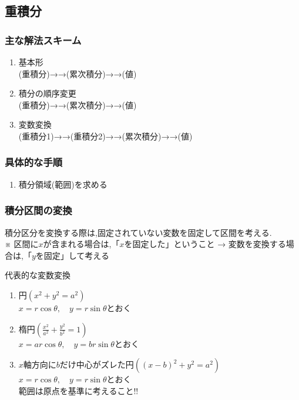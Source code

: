 \documentclass[a4paper]{jsarticle}
\begin{document}
\subsection{重積分}
\subsubsection{主な解法スキーム}
\begin{enumerate}[(1)]
    \item 基本形\\
          (重積分)→→(累次積分)→→(値)
    \item 積分の順序変更\\
          (重積分)→→(累次積分)→→(値)
    \item 変数変換\\
          (重積分1)→→(重積分2)→→(累次積分)→→(値)
\end{enumerate}
\subsubsection{具体的な手順}
\begin{enumerate}[(1)]
    \item 積分領域(範囲)を求める
\end{enumerate}
\subsubsection{積分区間の変換}
積分区分を変換する際は,固定されていない変数を固定して区間を考える.\\
※ 区間に$x$が含まれる場合は,「$x$を固定した」ということ → 変数を変換する場合は,「$y$を固定」して考える
\begin{itembox}[l]{代表的な変数変換}
    \begin{enumerate}[(1)]
        \item 円\quad $\left(x^2+y^2=a^2\right)$\\
              $x=r\cos\theta,\quad y=r\sin\theta$とおく
        \item 楕円\quad $\left(\frac{x^2}{a^2}+\frac{y^2}{b^2}=1\right)$\\
              $x=ar\cos\theta,\quad y=br\sin\theta$とおく
        \item $x$軸方向に$b$だけ中心がズレた円\quad $\left(\left(x-b\right)^2+y^2=a^2\right)$\\
              $x=r\cos\theta,\quad y=r\sin\theta$とおく\\
              範囲は原点を基準に考えること!!
    \end{enumerate}
\end{itembox}
\end{document}
